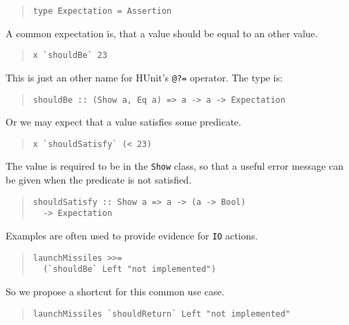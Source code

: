 \documentclass[preprint]{sigplanconf}
\begin{document}
\begin{quote}\small\begin{verbatim}
type Expectation = Assertion
\end{verbatim}\end{quote}

\noindent A common expectation is, that a value should be equal to an other
value.

\begin{quote}\small\begin{verbatim}
x `shouldBe` 23
\end{verbatim}\end{quote}

\noindent This is just an other name for HUnit's \texttt{@?=}
operator.  The type is:

\begin{quote}\small\begin{verbatim}
shouldBe :: (Show a, Eq a) => a -> a -> Expectation
\end{verbatim}\end{quote}

\noindent Or we may expect that a value satisfies some predicate.

\begin{quote}\small\begin{verbatim}
x `shouldSatisfy` (< 23)
\end{verbatim}\end{quote}

\noindent The value is required to be in the \texttt{Show} class, so that a
useful error message can be given when the predicate is not satisfied.

\begin{quote}\small\begin{verbatim}
shouldSatisfy :: Show a => a -> (a -> Bool)
  -> Expectation
\end{verbatim}\end{quote}

\noindent Examples are often used to provide evidence for {\tt IO}
actions.

\begin{quote}\small\begin{verbatim}
launchMissiles >>=
  (`shouldBe` Left "not implemented")
\end{verbatim}\end{quote}

\noindent So we propose a shortcut for this common use case.

\begin{quote}\small\begin{verbatim}
launchMissiles `shouldReturn` Left "not implemented"
\end{verbatim}\end{quote}
\end{document}
